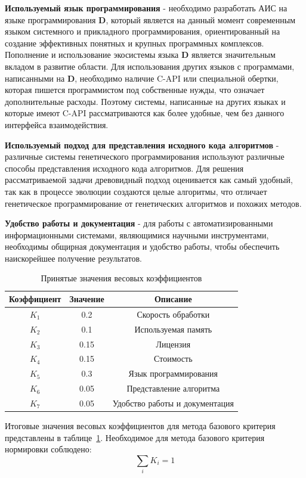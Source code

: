 \documentclass[russian,utf8,emptystyle]{eskdtext}
\begin{document}
\textbf{Используемый язык программирования} - необходимо разработать АИС на языке программирования \textbf{D}, который является на данный момент современным языком системного и прикладного программирования, ориентированный на создание эффективных понятных и крупных программных комплексов. Пополнение и использование экосистемы языка \textbf{D} является значительным вкладом в развитие области. Для использования других языков с программами, написанными на \textbf{D}, необходимо наличие C-API или специальной обертки, которая пишется программистом под собственные нужды, что означает дополнительные расходы. Поэтому системы, написанные на других языках и которые имеют C-API рассматриваются как более удобные, чем без данного интерфейса взаимодействия.

\textbf{Используемый подход для представления исходного кода алгоритмов} - различные системы генетического программирования используют различные способы представления исходного кода алгоритмов. Для решения рассматриваемой задачи древовидный подход оценивается как самый удобный, так как в процессе эволюции создаются целые алгоритмы, что отличает генетическое программирование от генетических алгоритмов и похожих методов.

\textbf{Удобство работы и документация} - для работы с автоматизированными информационными системами, являющимися научными инструментами, необходимы общирная документация и удобство работы, чтобы обеспечить наискорейшее получение результатов. 

\begin{table}
\centering
\caption{Принятые значения весовых коэффициентов}
\label{tab:quality_koeff}
\begin{tabular}{c|c|c}
Коэффициент & Значение & Описание \\ 
\hline 
$K_1$ & 0.2 & Скорость обработки \\ 
\hline 
$K_2$ & 0.1 & Используемая память \\ 
\hline 
$K_3$ & 0.15 & Лицензия \\ 
\hline 
$K_4$ & 0.15 & Стоимость \\ 
\hline 
$K_5$ & 0.3 & Язык программирования \\ 
\hline 
$K_6$ & 0.05 & Представление алгоритма \\ 
\hline 
$K_7$ & 0.05 & Удобство работы и документация 
\end{tabular} 
\end{table}

Итоговые значения весовых коэффициентов для метода базового критерия представлены в таблице~\ref{tab:quality_koeff}. Необходимое для метода базового критерия нормировки соблюдено:
$$
\sum_i K_i = 1
$$
\end{document}
